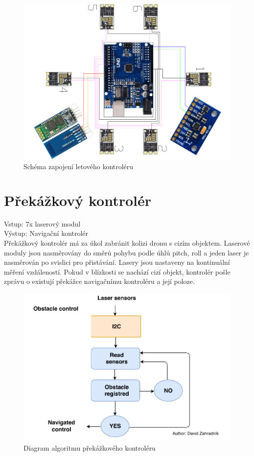 \begin{figure}[h]
	\centering
	\includegraphics[width=12cm,angle=90]{pictures/flyctrl.pdf}
	\caption{Schéma zapojení letového kontroléru}
\end{figure}

\section{Překážkový kontrolér} 
Vstup: 7x laserový modul\\
Výstup: Navigační kontrolér\\

Překážkový kontrolér má za úkol zabránit kolizi dronu s cizím objektem. Laserové moduly jsou nasměrovány do směrů pohybu podle úhlů pitch, roll a jeden laser je nasměrován po svislici pro přistávání. Lasery jsou nastaveny na kontinuální měření vzdáleností. Pokud v blízkosti se nachází cizí objekt, kontrolér pošle zprávu o existují překážce navigačnímu kontroléru a její poloze.\\

\begin{figure}[h]
	\centering
	\includegraphics[width=12cm]{pictures/ObstacleDiagram.pdf}
	\caption{Diagram algoritmu překážkového kontroléru}
\end{figure}

